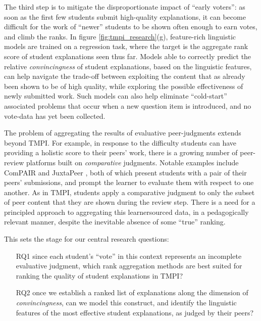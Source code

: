 \documentclass[notitlepage,12pt]{jedm}
\begin{document}
The third step is to mitigate the disproportionate impact of ``early voters'': 
as soon as the first few students submit high-quality explanations, it can 
become difficult for the work of ``newer'' students to be shown often enough to 
earn votes, and climb the ranks.
In figure \ref{fig:tmpi_research}(g), feature-rich linguistic models are 
trained on a regression task, where the target is the aggregate rank score of 
student explanations seen thus far. 
Models able to correctly predict the relative \textit{convincingness} of 
student explanations, based on the linguistic features, can help navigate the 
trade-off between exploiting the content that as already been shown to be of 
high quality, while exploring the possible effectiveness of newly submitted 
work.
Such models can also help eliminate ``cold-start'' associated problems that 
occur when a new question item is introduced, and no vote-data has yet been 
collected.

The problem of aggregating the results of evaluative peer-judgments extends  
beyond TMPI.
For example, in response to the difficulty students can have providing a 
holistic score to their peers' work, there is a growing number of peer-review 
platforms built on \textit{comparative} judgments.
Notable examples include ComPAIR \cite{potter_compair:_2017} and 
JuxtaPeer \cite{cambre_juxtapeer:_2018}, both of which present students with 
a pair of their peers' submissions, and prompt the learner to evaluate 
them with respect to one another.
As in TMPI, students apply a comparative judgment to only the subset of peer 
content that they are shown during the review step.
There is a need for a principled approach to aggregating this learnersourced 
data, in a pedagogically relevant manner, despite the inevitable absence of 
some ``true'' ranking.

This sets the stage for our central research questions: 
\begin{itemize}
	\item[RQ1] since each student's ``vote'' in this context represents an 
	incomplete evaluative judgment, which rank aggregation 
	methods are best suited for ranking the quality of student 
	explanations in TMPI?
	\item[RQ2] once we establish a ranked list of explanations along the 
	dimension of \textit{convincingness}, can we model this construct, and 
	identify the linguistic features of the most effective student 
	explanations, as judged by their peers?
\end{itemize}
\end{document}
